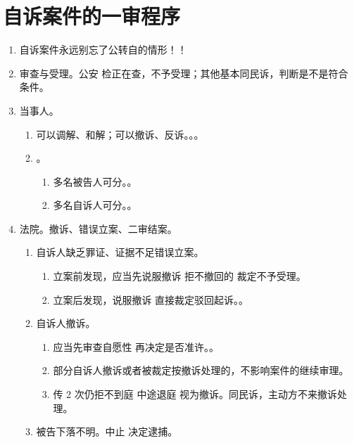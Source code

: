 \section{自诉案件的一审程序}
\begin{enumerate}
  \item 自诉案件永远别忘了公转自的情形！！
  \item 审查与受理。公安 \hz 检正在查，不予受理；其他基本同民诉，判断是不是符合条件。
  \item 当事人。
        \begin{enumerate}
          \item 可以调解、和解；可以撤诉、反诉。。。
          \item {}。
                \begin{enumerate}
                  \item 多名被告人可分。。
                  \item 多名自诉人可分。。
                \end{enumerate}
        \end{enumerate}
  \item 法院。撤诉、错误立案、二审结案。
        \begin{enumerate}
          \item 自诉人缺乏罪证、证据不足错误立案。
                \begin{enumerate}
                  \item 立案前发现，应当先说服撤诉 \yjt 拒不撤回的 \yjt 裁定不予受理。
                  \item 立案后发现，说服撤诉 \hz 直接裁定驳回起诉。。
                \end{enumerate}
          \item 自诉人撤诉。
                \begin{enumerate}
                  \item 应当先审查自愿性 \yjt 再决定是否准许。。
                  \item 部分自诉人撤诉或者被裁定按撤诉处理的，不影响案件的继续审理。
                  \item 传 2 次仍拒不到庭 \hz 中途退庭 \yjt 视为撤诉。同民诉，主动方不来撤诉处理。
                \end{enumerate}
          \item 被告下落不明。中止 \hz 决定逮捕。

\end{enumerate}
\end{enumerate}
